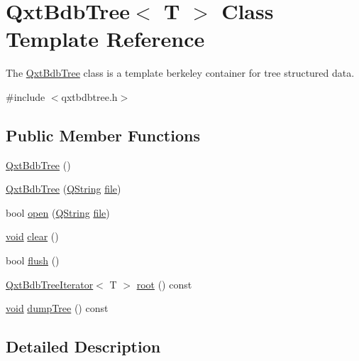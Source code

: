 \hypertarget{class_qxt_bdb_tree}{\section{Qxt\-Bdb\-Tree$<$ T $>$ Class Template Reference}
\label{class_qxt_bdb_tree}
}


The \hyperlink{class_qxt_bdb_tree}{Qxt\-Bdb\-Tree} class is a template berkeley container for tree structured data.  




{\ttfamily \#include $<$qxtbdbtree.\-h$>$}

\subsection*{Public Member Functions}
\begin{DoxyCompactItemize}
\item 
\hyperlink{class_qxt_bdb_tree_ac86018b8b97de88bced48a12d6bde24c}{Qxt\-Bdb\-Tree} ()
\item 
\hyperlink{class_qxt_bdb_tree_a4a0039e33300d73e7fa11da3f6bb0f09}{Qxt\-Bdb\-Tree} (\hyperlink{group___u_a_v_objects_plugin_gab9d252f49c333c94a72f97ce3105a32d}{Q\-String} \hyperlink{uavobjecttemplate_8m_a97c04efa65bcf0928abf9260bc5cbf46}{file})
\item 
bool \hyperlink{class_qxt_bdb_tree_a32daaad953219b5bf3c5620711e7159b}{open} (\hyperlink{group___u_a_v_objects_plugin_gab9d252f49c333c94a72f97ce3105a32d}{Q\-String} \hyperlink{uavobjecttemplate_8m_a97c04efa65bcf0928abf9260bc5cbf46}{file})
\item 
\hyperlink{group___u_a_v_objects_plugin_ga444cf2ff3f0ecbe028adce838d373f5c}{void} \hyperlink{class_qxt_bdb_tree_a3620f72f72e43f13b21944ddbc498ace}{clear} ()
\item 
bool \hyperlink{class_qxt_bdb_tree_aba88a7a64f5923fdf03b889c3b7087c2}{flush} ()
\item 
\hyperlink{class_qxt_bdb_tree_iterator}{Qxt\-Bdb\-Tree\-Iterator}$<$ T $>$ \hyperlink{class_qxt_bdb_tree_a2fa944b6d32264d0a90c58574bad4d4f}{root} () const 
\item 
\hyperlink{group___u_a_v_objects_plugin_ga444cf2ff3f0ecbe028adce838d373f5c}{void} \hyperlink{class_qxt_bdb_tree_ae83610a22960b12db697062d4871d5b7}{dump\-Tree} () const 
\end{DoxyCompactItemize}


\subsection{Detailed Description}
